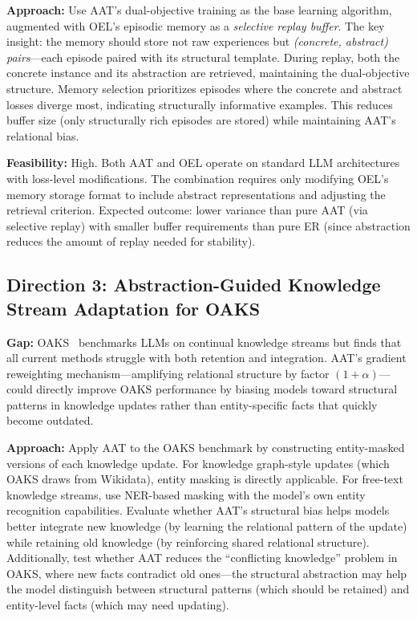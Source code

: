\documentclass[11pt]{article}
\begin{document}
\textbf{Approach:} Use AAT's dual-objective training as the base learning algorithm, augmented with OEL's episodic memory as a \textit{selective replay buffer}. The key insight: the memory should store not raw experiences but \textit{(concrete, abstract) pairs}---each episode paired with its structural template. During replay, both the concrete instance and its abstraction are retrieved, maintaining the dual-objective structure. Memory selection prioritizes episodes where the concrete and abstract losses diverge most, indicating structurally informative examples. This reduces buffer size (only structurally rich episodes are stored) while maintaining AAT's relational bias.

\textbf{Feasibility:} High. Both AAT and OEL operate on standard LLM architectures with loss-level modifications. The combination requires only modifying OEL's memory storage format to include abstract representations and adjusting the retrieval criterion. Expected outcome: lower variance than pure AAT (via selective replay) with smaller buffer requirements than pure ER (since abstraction reduces the amount of replay needed for stability).

\subsection{Direction 3: Abstraction-Guided Knowledge Stream Adaptation for OAKS}

\textbf{Gap:} OAKS~\cite{oaks} benchmarks LLMs on continual knowledge streams but finds that all current methods struggle with both retention and integration. AAT's gradient reweighting mechanism---amplifying relational structure by factor $(1+\alpha)$---could directly improve OAKS performance by biasing models toward structural patterns in knowledge updates rather than entity-specific facts that quickly become outdated.

\textbf{Approach:} Apply AAT to the OAKS benchmark by constructing entity-masked versions of each knowledge update. For knowledge graph-style updates (which OAKS draws from Wikidata), entity masking is directly applicable. For free-text knowledge streams, use NER-based masking with the model's own entity recognition capabilities. Evaluate whether AAT's structural bias helps models better integrate new knowledge (by learning the relational pattern of the update) while retaining old knowledge (by reinforcing shared relational structure). Additionally, test whether AAT reduces the ``conflicting knowledge'' problem in OAKS, where new facts contradict old ones---the structural abstraction may help the model distinguish between structural patterns (which should be retained) and entity-level facts (which may need updating).
\end{document}
